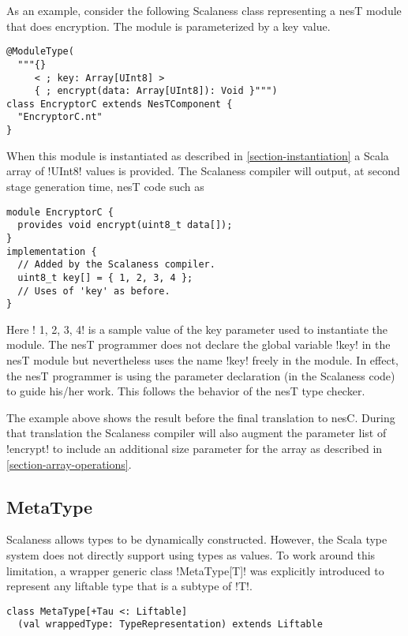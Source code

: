 As an example, consider the following Scalaness class representing a nesT module that does
encryption. The module is parameterized by a key value.

\singlespace
\vspace{1.0ex}
\begin{lstlisting}[language=scalaness]
@ModuleType(
  """{}
     < ; key: Array[UInt8] >
     { ; encrypt(data: Array[UInt8]): Void }""")
class EncryptorC extends NesTComponent {
  "EncryptorC.nt"
}
\end{lstlisting}
\vspace{1.0ex}
\primaryspacing

When this module is instantiated as described in \autoref{section-instantiation} a Scala array
of !UInt8! values is provided. The Scalaness compiler will output, at second stage generation
time, nesT code such as

\singlespace
\vspace{1.0ex}
\begin{lstlisting}[language=nesC]
module EncryptorC {
  provides void encrypt(uint8_t data[]);
}
implementation {
  // Added by the Scalaness compiler.
  uint8_t key[] = { 1, 2, 3, 4 };
  // Uses of 'key' as before.
}
\end{lstlisting}
\vspace{1.0ex}
\primaryspacing

Here !{ 1, 2, 3, 4}! is a sample value of the key parameter used to instantiate the module. The
nesT programmer does not declare the global variable !key! in the nesT module but nevertheless
uses the name !key! freely in the module. In effect, the nesT programmer is using the parameter
declaration (in the Scalaness code) to guide his/her work. This follows the behavior of the nesT
type checker.

The example above shows the result before the final translation to nesC. During that translation
the Scalaness compiler will also augment the parameter list of !encrypt! to include an
additional size parameter for the array as described in \autoref{section-array-operations}.


\subsection{MetaType}
\label{section-metatype}

Scalaness allows types to be dynamically constructed. However, the Scala type system does not
directly support using types as values. To work around this limitation, a wrapper generic class
!MetaType[T]! was explicitly introduced to represent any liftable type that is a subtype of !T!.
\singlespace
\vspace{1.0ex}
\begin{lstlisting}[language=scalaness]
class MetaType[+Tau <: Liftable]
  (val wrappedType: TypeRepresentation) extends Liftable
\end{lstlisting}
\vspace{1.0ex}
\primaryspacing

